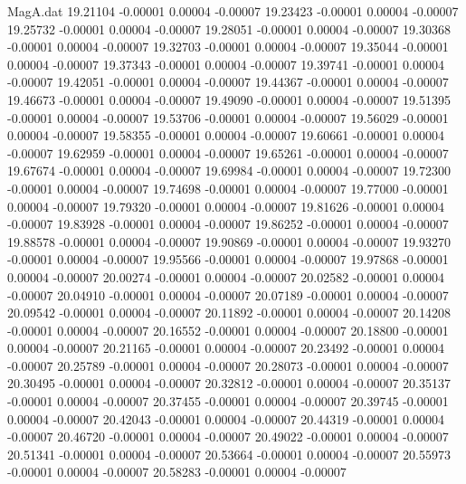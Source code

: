 \begin{filecontents}{MagA.dat}
  19.21104   -0.00001    0.00004   -0.00007
  19.23423   -0.00001    0.00004   -0.00007
  19.25732   -0.00001    0.00004   -0.00007
  19.28051   -0.00001    0.00004   -0.00007
  19.30368   -0.00001    0.00004   -0.00007
  19.32703   -0.00001    0.00004   -0.00007
  19.35044   -0.00001    0.00004   -0.00007
  19.37343   -0.00001    0.00004   -0.00007
  19.39741   -0.00001    0.00004   -0.00007
  19.42051   -0.00001    0.00004   -0.00007
  19.44367   -0.00001    0.00004   -0.00007
  19.46673   -0.00001    0.00004   -0.00007
  19.49090   -0.00001    0.00004   -0.00007
  19.51395   -0.00001    0.00004   -0.00007
  19.53706   -0.00001    0.00004   -0.00007
  19.56029   -0.00001    0.00004   -0.00007
  19.58355   -0.00001    0.00004   -0.00007
  19.60661   -0.00001    0.00004   -0.00007
  19.62959   -0.00001    0.00004   -0.00007
  19.65261   -0.00001    0.00004   -0.00007
  19.67674   -0.00001    0.00004   -0.00007
  19.69984   -0.00001    0.00004   -0.00007
  19.72300   -0.00001    0.00004   -0.00007
  19.74698   -0.00001    0.00004   -0.00007
  19.77000   -0.00001    0.00004   -0.00007
  19.79320   -0.00001    0.00004   -0.00007
  19.81626   -0.00001    0.00004   -0.00007
  19.83928   -0.00001    0.00004   -0.00007
  19.86252   -0.00001    0.00004   -0.00007
  19.88578   -0.00001    0.00004   -0.00007
  19.90869   -0.00001    0.00004   -0.00007
  19.93270   -0.00001    0.00004   -0.00007
  19.95566   -0.00001    0.00004   -0.00007
  19.97868   -0.00001    0.00004   -0.00007
  20.00274   -0.00001    0.00004   -0.00007
  20.02582   -0.00001    0.00004   -0.00007
  20.04910   -0.00001    0.00004   -0.00007
  20.07189   -0.00001    0.00004   -0.00007
  20.09542   -0.00001    0.00004   -0.00007
  20.11892   -0.00001    0.00004   -0.00007
  20.14208   -0.00001    0.00004   -0.00007
  20.16552   -0.00001    0.00004   -0.00007
  20.18800   -0.00001    0.00004   -0.00007
  20.21165   -0.00001    0.00004   -0.00007
  20.23492   -0.00001    0.00004   -0.00007
  20.25789   -0.00001    0.00004   -0.00007
  20.28073   -0.00001    0.00004   -0.00007
  20.30495   -0.00001    0.00004   -0.00007
  20.32812   -0.00001    0.00004   -0.00007
  20.35137   -0.00001    0.00004   -0.00007
  20.37455   -0.00001    0.00004   -0.00007
  20.39745   -0.00001    0.00004   -0.00007
  20.42043   -0.00001    0.00004   -0.00007
  20.44319   -0.00001    0.00004   -0.00007
  20.46720   -0.00001    0.00004   -0.00007
  20.49022   -0.00001    0.00004   -0.00007
  20.51341   -0.00001    0.00004   -0.00007
  20.53664   -0.00001    0.00004   -0.00007
  20.55973   -0.00001    0.00004   -0.00007
  20.58283   -0.00001    0.00004   -0.00007

\end{filecontents}
